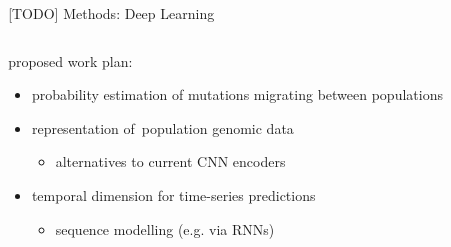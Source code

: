 \documentclass[final,hyperref={pdfpagelabels=false}]{beamer}
\begin{document}
\begin{frame}[t]
\begin{columns}[t]
\begin{column}{.465\textwidth}
\end{column} %

\begin{column}{.03\textwidth}\end{column} %
 
\begin{column}{.465\textwidth} %



\begin{block}{[TODO] Methods: Deep Learning}

\begin{columns} %
\begin{column}{.6\textwidth} %
proposed work plan:
\begin{itemize}
	\item probability estimation of mutations migrating between populations
	
	\item representation of~population genomic data
    \begin{itemize}
		 \item alternatives to current CNN encoders
    \end{itemize}
    
    \item temporal dimension for time-series predictions
    \begin{itemize}
		 \item sequence modelling (e.g. via RNNs)
    \end{itemize}
    
\end{itemize}
\end{column}

\begin{column}{.4\textwidth} %
\centering


\end{column}
\end{columns}
\end{block}
\end{column}
\end{columns}
\end{frame}
\end{document}
